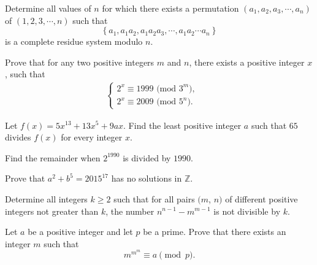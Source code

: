 \documentclass{subfile}
\begin{document}
	\begin{problem} %
		Determine all values of $n$ for which there exists a permutation $(a_1,a_2,a_3,\cdots,a_n)$ of $(1,2,3,\cdots,n)$ such that $$\left\{ {{a_1},{a_1}{a_2},{a_1}{a_2}{a_3},\cdots,{a_1}{a_2}\cdots{a_n}} \right\}$$ is a complete residue system modulo $n$.
	\end{problem}
	
	\begin{problem} %
		Prove that for any two positive integers $m$ and $n$, there exists a positive integer $x$, such that
		\begin{align*}
		\left\{\begin{matrix} 2^x \equiv 1999 \text{ (mod }3^m), & & \\ 2^x \equiv 2009 \text{ (mod }5^n). & & \end{matrix}\right.
		\end{align*}
	\end{problem}
	
	\begin{problem} %
		Let $f(x) = 5 x^{13} + 13 x^5 + 9ax$. Find the least positive integer $a$ such that $65$ divides $f(x)$ for every integer $x$.
	\end{problem}
	
	\begin{problem} %
		Find the remainder when $2^{1990}$ is divided by $1990$.
	\end{problem}
	
	\begin{problem} %
		Prove that $a^{2}+b^{5}=2015^{17}$ has no solutions in $\mathbb{Z}$.
	\end{problem}
	
	\begin{problem} %
		Determine all integers $ k\ge 2$ such that for all pairs $ (m$, $ n)$ of different positive integers not greater than $ k$, the number $ n^{n-1}-m^{m-1}$ is not divisible by $ k$.
	\end{problem}
	
	\begin{problem}[ELMO 2000] %
		Let $a$ be a positive integer and let $p$ be a prime. Prove that there exists an integer $m$ such that \[ m^{m^m} \equiv a \pmod p. \]
	\end{problem}
	
\end{document}
